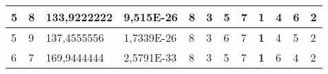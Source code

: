 \documentclass[conference]{IEEEtran}
\begin{document}
\begin{table*}[]
\begin{tabular}{|llll|llllllll|}
\multicolumn{1}{|l|}{5}                                                              & \multicolumn{1}{l|}{8}                                                                 & \multicolumn{1}{l|}{133,9222222}                                                           & 9,515E-26                               & \multicolumn{1}{l|}{8}                                                           & \multicolumn{1}{l|}{3}                                                           & \multicolumn{1}{l|}{5}                                                           & \multicolumn{1}{l|}{7}                                                           & \multicolumn{1}{l|}{\textbf{1}}                                                  & \multicolumn{1}{l|}{4}                                                           & \multicolumn{1}{l|}{6}                                                           & 2                                   \\ \hline
\multicolumn{1}{|l|}{5}                                                              & \multicolumn{1}{l|}{9}                                                                 & \multicolumn{1}{l|}{137,4555556}                                                           & 1,7339E-26                              & \multicolumn{1}{l|}{8}                                                           & \multicolumn{1}{l|}{3}                                                           & \multicolumn{1}{l|}{6}                                                           & \multicolumn{1}{l|}{7}                                                           & \multicolumn{1}{l|}{\textbf{1}}                                                  & \multicolumn{1}{l|}{4}                                                           & \multicolumn{1}{l|}{5}                                                           & 2                                   \\ \hline
\multicolumn{1}{|l|}{6}                                                              & \multicolumn{1}{l|}{7}                                                                 & \multicolumn{1}{l|}{169,9444444}                                                           & 2,5791E-33                              & \multicolumn{1}{l|}{8}                                                           & \multicolumn{1}{l|}{3}                                                           & \multicolumn{1}{l|}{5}                                                           & \multicolumn{1}{l|}{7}                                                           & \multicolumn{1}{l|}{\textbf{1}}                                                  & \multicolumn{1}{l|}{6}                                                           & \multicolumn{1}{l|}{4}                                                           & 2                                   \\ \hline

\end{tabular}
\end{table*}
\end{document}
